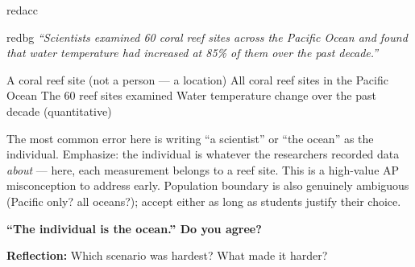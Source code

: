 \documentclass[10pt]{article}
\begin{document}
\begin{scenariobox}{redacc}

\begin{headlinebox}{redbg}
\small\textit{``Scientists examined 60 coral reef sites across the Pacific Ocean
and found that water temperature had increased at 85\% of them over the past decade.''}
\end{headlinebox}

\vspace{8pt}
\componenttablekey
  {A coral reef site (not a person --- a location)}
  {All coral reef sites in the Pacific Ocean}
  {The 60 reef sites examined}
  {Water temperature change over the past decade (quantitative)}

\vspace{6pt}
\begin{teachernote}
\scriptsize
The most common error here is writing ``a scientist'' or ``the ocean'' as the individual.
Emphasize: the individual is whatever the researchers recorded data \emph{about} --- here,
each measurement belongs to a reef site. This is a high-value AP misconception to address early.
Population boundary is also genuinely ambiguous (Pacific only? all oceans?); accept either
as long as students justify their choice.
\end{teachernote}

\vspace{8pt}
\small\textbf{``The individual is the ocean.'' Do you agree?}\\[4pt]

\end{scenariobox}

\vspace{0.12in}

\begin{tcolorbox}[colback=goldbg, colframe=goldacc, boxrule=0.8pt, arc=2mm,
    left=3mm, right=3mm, top=2mm, bottom=2mm]
\small\textbf{Reflection:} \quad Which scenario was hardest? What made it harder?\\[4pt]
\end{tcolorbox}
\end{document}
